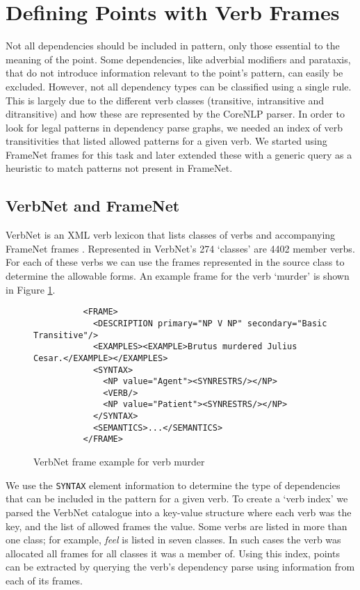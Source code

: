   \section{Defining Points with Verb Frames}
    Not all dependencies should be included in pattern, only those essential to the meaning of the point. Some dependencies, like adverbial modifiers and parataxis, that do not introduce information relevant to the point's pattern, can easily be excluded. However, not all dependency types can be classified using a single rule. This is largely due to the different verb classes (transitive, intransitive and ditransitive) and how these are represented by the CoreNLP parser. In order to look for legal patterns in dependency parse graphs, we needed an index of verb transitivities that listed allowed patterns for a given verb. We started using FrameNet frames for this task and later extended these with a generic query as a heuristic to match patterns not present in FrameNet.

    \tocless\subsection{VerbNet and FrameNet}
      VerbNet is an XML verb lexicon that lists classes of verbs and accompanying FrameNet frames \cite{schuler2005verbnet,fillmore2002framenet}. Represented in VerbNet's 274 `classes' are 4402 member verbs. For each of these verbs we can use the frames represented in the source class to determine the allowable forms. An example frame for the verb `murder' is shown in Figure \ref{fig:murder-frame}.

      \begin{figure}
        \centering
        \caption{VerbNet frame example for verb murder}

        \lstset{language=XML}
        \begin{lstlisting}
          <FRAME>
            <DESCRIPTION primary="NP V NP" secondary="Basic Transitive"/>
            <EXAMPLES><EXAMPLE>Brutus murdered Julius Cesar.</EXAMPLE></EXAMPLES>
            <SYNTAX>
              <NP value="Agent"><SYNRESTRS/></NP>
              <VERB/>
              <NP value="Patient"><SYNRESTRS/></NP>
            </SYNTAX>
            <SEMANTICS>...</SEMANTICS>
          </FRAME>
        \end{lstlisting}
        \label{fig:murder-frame}
      \end{figure}

      We use the \texttt{SYNTAX} element information to determine the type of dependencies that can be included in the pattern for a given verb. To create a `verb index' we parsed the VerbNet catalogue into a key-value structure where each verb was the key, and the list of allowed frames the value. Some verbs are listed in more than one class; for example, \textit{feel} is listed in seven classes. In such cases the verb was allocated all frames for all classes it was a member of. Using this index, points can be extracted by querying the verb's dependency parse using information from each of its frames.

